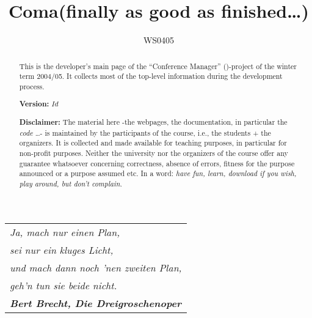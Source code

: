\documentclass[11pt]{article}
\title{{\huge\bf Coma}\ifweb (finally as good as finished\ldots)\fi}
\author{WS0405}
\date{}
\begin{document}
\vspace{-2cm}


\ifweb

\fi

\maketitle{}



\begin{abstract}
  This is the developer's main page of the ``Conference Manager''
  (\Coma)-project of the winter term 2004/05. It collects most of the
  top-level information during the development process.

  \medskip
  
  \textbf{Version:} \texttt{$Id$}
  
  \medskip
  
  \textbf{Disclaimer:} The material here -the webpages, the documentation,
  in particular the \emph{code} \ldots- is maintained by the participants
  of the course, i.e., the students + the organizers. It is collected and
  made available for teaching purposes, in particular for non-profit
  purposes. Neither the university nor the organizers of the course offer
  any guarantee whatsoever concerning correctness, absence of errors,
  fitness for the purpose announced or a purpose assumed etc. In a word:
  \emph{have fun, learn, download if you wish, play around, but don't
    complain.}
\end{abstract}







%



{\centering
  \begin{minipage}{10cm}
    \begin{tabular}[t]{l}
    \em
    Ja, mach nur einen Plan, 
    \\
    \emph{sei nur ein kluges Licht, }
    \\ 
    \emph{und mach dann noch 'nen zweiten Plan, }
    \\
    \emph{geh'n tun sie beide nicht.}
    \\
    \textbf{\em Bert Brecht, Die Dreigroschenoper}
\end{tabular}
  \end{minipage}}
\end{document}
